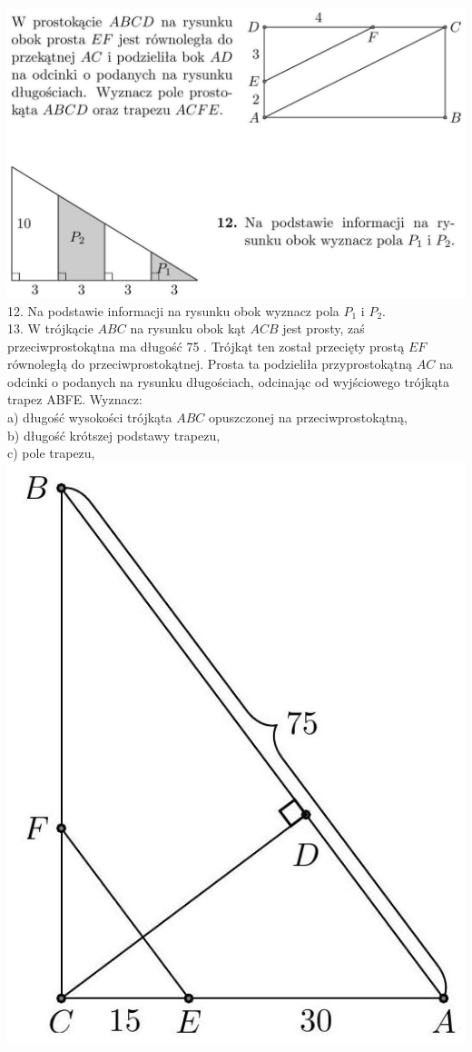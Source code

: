 \documentclass[10pt]{article}
\begin{document}
\includegraphics[max width=\textwidth, center]{2024_11_21_e9b4faa005d5be2cc318g-010(2)}\\
12. Na podstawie informacji na rysunku obok wyznacz pola \(P_{1}\) i \(P_{2}\).\\
13. W trójkącie \(A B C\) na rysunku obok kąt \(A C B\) jest prosty, zaś przeciwprostokątna ma długość 75 . Trójkąt ten został przecięty prostą \(E F\) równoległą do przeciwprostokątnej. Prosta ta podzieliła przyprostokątną \(A C\) na odcinki o podanych na rysunku długościach, odcinając od wyjściowego trójkąta trapez ABFE. Wyznacz:\\
a) długość wysokości trójkąta \(A B C\) opuszczonej na przeciwprostokątną,\\
b) długość krótszej podstawy trapezu,\\
c) pole trapezu,\\
\includegraphics[max width=\textwidth, center]{2024_11_21_e9b4faa005d5be2cc318g-010(1)}\\
\end{document}
